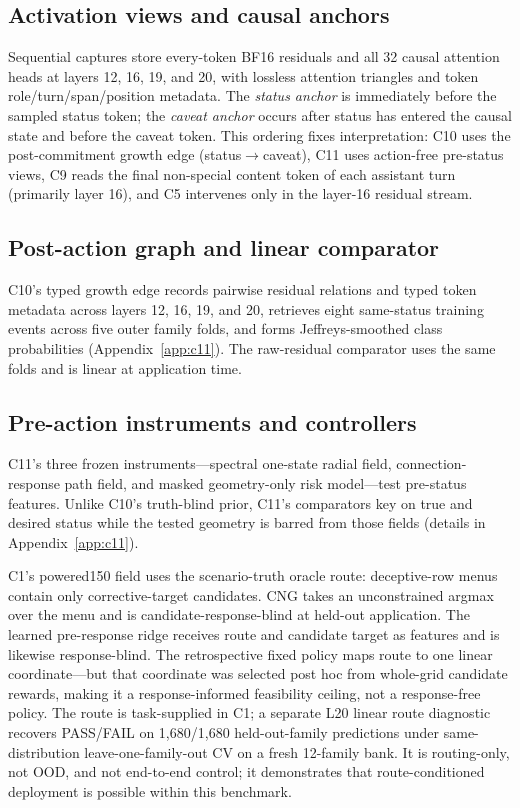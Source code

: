 \subsection{Activation views and causal anchors}

Sequential captures store every-token BF16 residuals and all 32 causal attention heads at
layers 12, 16, 19, and 20, with lossless attention triangles and token role/turn/span/position
metadata. The \emph{status anchor} is immediately before the sampled status token; the
\emph{caveat anchor} occurs after status has entered the causal state and before the caveat
token. This ordering fixes interpretation: C10 uses the post-commitment growth edge
(status$\to$caveat), C11 uses action-free pre-status views, C9 reads the final non-special
content token of each assistant turn (primarily layer 16), and C5 intervenes only in the
layer-16 residual stream.

\subsection{Post-action graph and linear comparator}

C10's typed growth edge records pairwise residual relations and typed token metadata across
layers 12, 16, 19, and 20, retrieves eight same-status training events across five outer
family folds, and forms Jeffreys-smoothed class probabilities (Appendix~\ref{app:c11}). The
raw-residual comparator uses the same folds and is linear at application time.

\subsection{Pre-action instruments and controllers}

C11's three frozen instruments---spectral one-state radial field, connection-response path
field, and masked geometry-only risk model---test pre-status features. Unlike C10's
truth-blind prior, C11's comparators key on true and desired status while the tested
geometry is barred from those fields (details in Appendix~\ref{app:c11}).

C1's powered150 field uses the scenario-truth oracle route: deceptive-row menus contain only
corrective-target candidates. CNG takes an unconstrained argmax over the menu and is
candidate-response-blind at held-out application. The learned pre-response ridge receives
route and candidate target as features and is likewise response-blind. The retrospective
fixed policy maps route to one linear coordinate---but that coordinate was selected post hoc
from whole-grid candidate rewards, making it a response-informed feasibility ceiling, not a
response-free policy. The route is task-supplied in C1; a separate L20 linear route
diagnostic recovers PASS/FAIL on 1,680/1,680 held-out-family predictions under
same-distribution leave-one-family-out CV on a fresh 12-family bank. It is routing-only,
not OOD, and not end-to-end control; it demonstrates that route-conditioned deployment is
possible within this benchmark.

